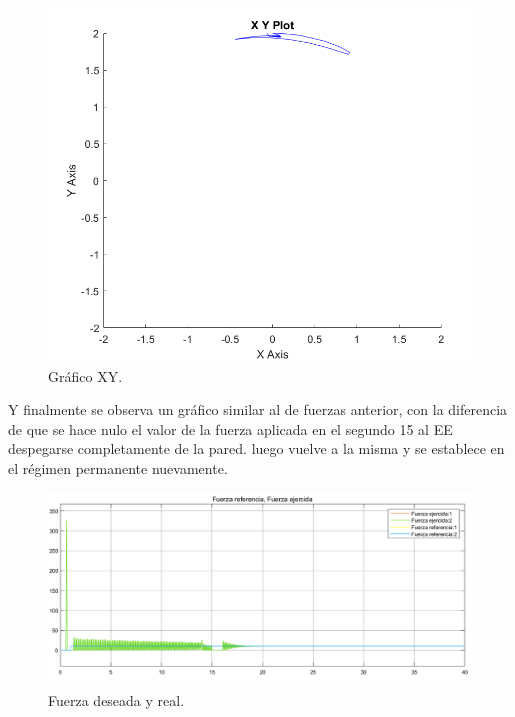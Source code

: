 \begin{figure}[H]
	\centering
	\includegraphics[width=0.5\linewidth]{ImagenesControl de fuerza no lineal/2_3_f_c}
	\caption{Gr\'afico XY.}	
	\label{fig:bxyd}
\end{figure}
Y finalmente se observa un gráfico similar al de fuerzas anterior, con la diferencia de que se hace nulo el valor de la fuerza aplicada en el segundo 15 al EE despegarse completamente de la pared. luego vuelve a la misma y se establece en el régimen permanente nuevamente.
\begin{figure}[H]
	\centering
	\includegraphics[width=0.8\linewidth]{ImagenesControl de fuerza no lineal/2_3_f_e}
	\caption{Fuerza deseada y real.}	
	\label{fig:bfd}
\end{figure}
%
